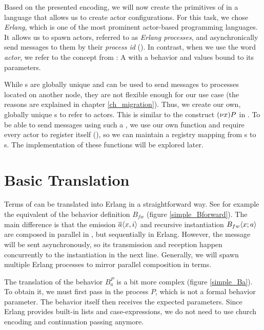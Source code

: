 Based on the presented encoding,
we will now create the primitives of \corejoincalc
in a language that allows us to create actor configurations.
For this task, we chose \emph{Erlang},
which is one of the most prominent actor-based programming languages.
It allows us to spawn actors, referred to as \emph{Erlang processes},
and asynchronically send messages to them by their \emph{process id} (\PID).
In contrast, when we use the word \emph{actor},
we refer to the concept from \actorpicalc:
A \actorname with a behavior and values bound to its parameters.

While \PID{}s are globally unique and can be used to send messages to
processes located on another node,
they are not flexible enough for our use case
(the reasons are explained in chapter \ref{ch_migration}).
Thus, we create our own, globally unique \actorname{}s to refer to actors.
This is similar to the construct $\anew{x}{P}$ in \actorpicalc.
To be able to send messages using such a \actorname,
we use our own  function and require every actor to register itself
(),
so we can maintain a registry mapping from \actorname{}s to \PID{}s.
The implementation of these functions will be explored later.


\section{Basic Translation}

Terms of \actorpicalc can be translated into Erlang in a straightforward way.
See for example the equivalent of the behavior definition $B_{fw}$
(figure \ref{simple_Bforward}).
The main difference is that the emission $\overline{a}\langle x,i\rangle$
and recursive instantiation $B_{fw} \langle x ; a \rangle$
are composed in parallel in \actorpicalc,
but sequentially in Erlang.
However, the message will be sent asynchronously,
so its transmission and reception happen concurrently to the instantiation
in the next line.
Generally, we will spawn multiple Erlang processes to
mirror parallel composition in \actorpicalc terms.


The translation of the behavior $B_a^P$ is a bit more complex
(figure \ref{simple_Ba}).
To obtain it, we must first pass in the process $P$,
which is not a formal behavior parameter.
The behavior itself then receives the expected parameters.
Since Erlang provides built-in lists and case-expressions,
we do not need to use church encoding and continuation passing anymore.

